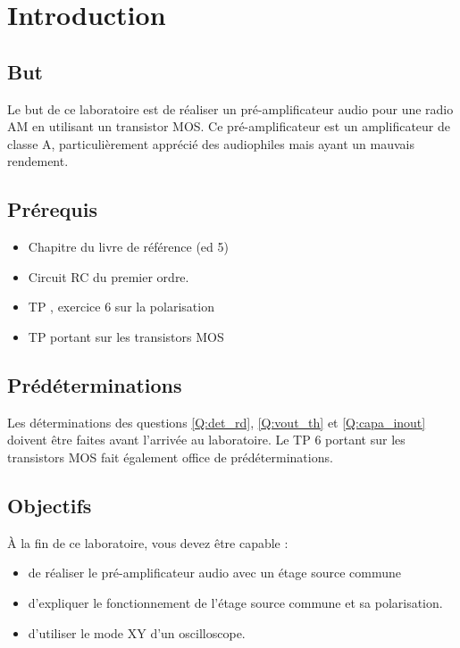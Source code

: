 \documentclass{../template/tp}
\author{The Fantastic Four} %
\begin{document}

\section{Introduction}
\subsection{But}

Le but de ce laboratoire est de réaliser un pré-amplificateur audio pour une radio AM en utilisant un transistor MOS. Ce pré-amplificateur est un amplificateur de classe A, particulièrement apprécié des audiophiles mais ayant un mauvais rendement.

\subsection{Prérequis}
\begin{itemize}
\item Chapitre  du livre de référence (ed 5)
\item Circuit RC du premier ordre.
\item TP , exercice 6 sur la polarisation
\item TP  portant sur les transistors MOS

\end{itemize}

\subsection{Prédéterminations}

Les déterminations des questions \ref{Q:det_rd}, \ref{Q:vout_th} et \ref{Q:capa_inout} doivent être faites avant l'arrivée au laboratoire. Le TP 6 portant sur les transistors MOS fait également office de prédéterminations.


\subsection{Objectifs}

À la fin de ce laboratoire, vous devez être capable :
\begin{itemize}
\item de réaliser le pré-amplificateur audio avec un étage source commune
\item d'expliquer le fonctionnement de l'étage source commune et sa polarisation.
\item d'utiliser le mode XY d'un oscilloscope.
\end{itemize}
\end{document}
